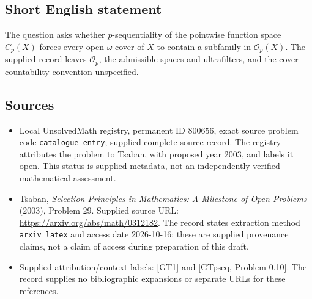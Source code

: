 \documentclass[11pt]{article}
\begin{document}
\subsection{Short English statement}
The question asks whether \(p\)-sequentiality of the pointwise function space \(C_p(X)\) forces every open \(\omega\)-cover of \(X\) to contain a subfamily in \(\mathcal O_p(X)\). The supplied record leaves \(\mathcal O_p\), the admissible spaces and ultrafilters, and the cover-countability convention unspecified.
\subsection{Sources}
\begin{itemize}
\item Local UnsolvedMath registry, permanent ID \(800656\), exact source problem code \texttt{catalogue entry}; supplied complete source record. The registry attributes the problem to Tsaban, with proposed year 2003, and labels it open. This status is supplied metadata, not an independently verified mathematical assessment.
\item Tsaban, \emph{Selection Principles in Mathematics: A Milestone of Open Problems} (2003), Problem 29. Supplied source URL: \url{https://arxiv.org/abs/math/0312182}. The record states extraction method \texttt{arxiv\_latex} and access date 2026-10-16; these are supplied provenance claims, not a claim of access during preparation of this draft.
\item Supplied attribution/context labels: [GT1] and [GTpseq, Problem 0.10]. The record supplies no bibliographic expansions or separate URLs for these references.
\end{itemize}
\end{document}
